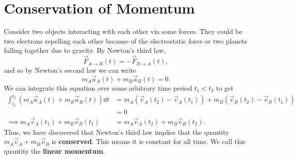\documentclass[../classical_mechanics.tex]{subfiles}
\begin{document}
    \section{Conservation of Momentum}\label{sec:conservation-of-momentum}
        Consider two objects interacting with each other via some forces.
        They could be two electrons repelling each other because of the electrostatic force or two planets falling together due to gravity.
        By Newton's third law,
        \begin{equation}
            \vec{F}_{A\to B}(t)=-\vec{F}_{B\to A}(t),
        \end{equation}
        and so by Newton's second law we can write
        \begin{equation}\label{eq-COM-acc}
            m_A\vec{a}_A(t)+m_B\vec{a}_B(t)=0.
        \end{equation}
        We can integrate this equation over some arbitrary time period $t_1<t_2$ to get
        \begin{align}
            \int_{t_1}^{t_2}\left(m_A\vec{a}_A(t)+m_B\vec{a}_B(t)\right)\dd{t}&=m_A\left(\vec{v}_A(t_2)-\vec{v}_A(t_1)\right)+m_B\left(\vec{v}_B(t_2)-\vec{v}_B(t_1)\right)\\
            &=0\\
            \implies m_A\vec{v}_A(t_1)+m_B\vec{v}_B(t_1)&=m_A\vec{v}_A(t_2)+m_B\vec{v}_B(t_2).
        \end{align}
        Thus, we have discovered that Newton's third law implies that the quantity $m_A\vec{v}_A+m_B\vec{v}_B$ is \textbf{conserved}.
        This means it is constant for all time. We call this quantity the \textbf{linear momentum}.
\end{document}

